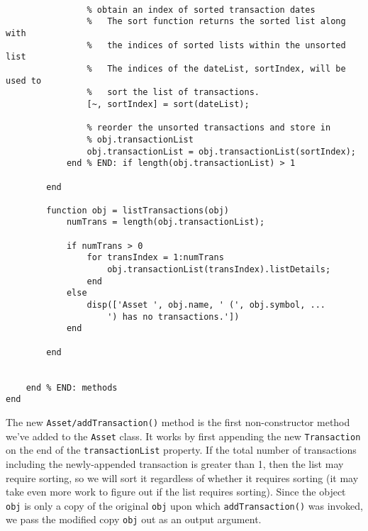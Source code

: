 \begin{lstlisting}[style=Matlab-editor]
                % sort the transaction list
                
                % obtain an index of sorted transaction dates
                %   The sort function returns the sorted list along with
                %   the indices of sorted lists within the unsorted list
                %   The indices of the dateList, sortIndex, will be used to
                %   sort the list of transactions.
                [~, sortIndex] = sort(dateList);
                
                % reorder the unsorted transactions and store in
                % obj.transactionList
                obj.transactionList = obj.transactionList(sortIndex);
            end % END: if length(obj.transactionList) > 1
                
        end
        
        function obj = listTransactions(obj)
            numTrans = length(obj.transactionList);
            
            if numTrans > 0
                for transIndex = 1:numTrans
                    obj.transactionList(transIndex).listDetails;
                end
            else
                disp(['Asset ', obj.name, ' (', obj.symbol, ...
                    ') has no transactions.'])
            end
            
        end

        
    end % END: methods
end
\end{lstlisting}
The new \texttt{Asset/addTransaction()} method is the first non-constructor method we've added to the \texttt{Asset} class. It works by first appending the new \texttt{Transaction} on the end of the \texttt{transactionList} property. If the total number of transactions \textemdash including the newly-appended transaction \textemdash is greater than 1, then the list may require sorting, so we will sort it regardless of whether it requires sorting (it may take even more work to figure out if the list requires sorting). Since the object \texttt{obj} is only a copy of the original \texttt{obj} upon which \texttt{addTransaction()} was invoked, we pass the modified copy \texttt{obj} out as an output argument.


